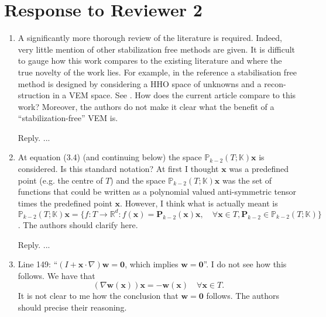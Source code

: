 \documentclass[10pt]{amsart}
\theoremstyle{definition}
\theoremstyle{remark}
\begin{document}
\section{Response to Reviewer 2}

\begin{enumerate}[1.]
\item \textsf{A significantly more thorough review of the literature is required. Indeed, very little mention of other stabilization free methods are given. It is difficult to gauge how this work compares to the existing literature and where the true novelty of the work lies. For example, in the reference \cite{CicuttinErnLemaire2019} a stabilisation free method is designed by considering a HHO space of unknowns and a recon- struction in a VEM space. See \cite[Remark 5.1]{CicuttinErnLemaire2019}. How does the current article compare to this work? Moreover, the authors do not make it clear what the benefit of a “stabilization-free” VEM is.}

\smallskip \noindent \textcolor[rgb]{1.00,0.00,0.00}{Reply.}
...

\medskip

\item \textsf{At equation (3.4) (and continuing below) the space $\mathbb P_{k-2}(T;\mathbb K)\boldsymbol{x}$ is considered. Is this standard notation? At first I thought $\boldsymbol{x}$ was a predefined point (e.g. the centre of $T$) and the space $\mathbb P_{k-2}(T;\mathbb K)\boldsymbol{x}$ was the set of functions that could be written as a polynomial valued anti-symmetric tensor times the predefined point $\boldsymbol{x}$. However, I think what is actually meant is $\mathbb P_{k-2}(T;\mathbb K)\boldsymbol{x}=\{f:T\to\mathbb R^d: f(\boldsymbol{x})=\boldsymbol{P}_{k-2}(\boldsymbol{x})\boldsymbol{x},\quad \forall\boldsymbol{x}\in T, \boldsymbol{P}_{k-2}\in \mathbb P_{k-2}(T;\mathbb K)\}$. The authors should clarify here.}

\smallskip \noindent \textcolor[rgb]{1.00,0.00,0.00}{Reply.}
...

\medskip

\item \textsf{Line 149: “$(I +\boldsymbol{x}\cdot\nabla)\boldsymbol{w} = \boldsymbol{0}$, which implies $\boldsymbol{w} = \boldsymbol{0}$”. I do not see how this follows. We have that
$$(\nabla\boldsymbol{w}(\boldsymbol{x}))\boldsymbol{x}=-\boldsymbol{w}(\boldsymbol{x})\quad\forall\boldsymbol{x}\in T.
$$
It is not clear to me how the conclusion that $\boldsymbol{w} = \boldsymbol{0}$ follows. The authors
should precise their reasoning.}


\end{enumerate}
\end{document}
